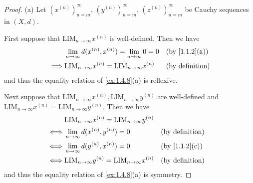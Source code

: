 \begin{proof}{(a)}
  Let \((x^{(n)})_{n = m}^\infty\), \((y^{(n)})_{n = m}^\infty\), \((z^{(n)})_{n = m}^\infty\) be Cauchy sequences in \((X, d)\).

  First suppose that \(\text{LIM}_{n \to \infty} x^{(n)}\) is well-defined.
  Then we have
  \begin{align*}
             & \lim_{n \to \infty} d(x^{(n)}, x^{(n)}) = \lim_{n \to \infty} 0 = 0   &  & \text{(by \cref{1.1.2}(a))} \\
    \implies & \text{LIM}_{n \to \infty} x^{(n)} = \text{LIM}_{n \to \infty} x^{(n)} &  & \text{(by definition)}
  \end{align*}
  and thus the equality relation of \cref{ex:1.4.8}(a) is reflexive.

  Next suppose that \(\text{LIM}_{n \to \infty} x^{(n)}, \text{LIM}_{n \to \infty} y^{(n)}\) are well-defined and \(\text{LIM}_{n \to \infty} x^{(n)} = \text{LIM}_{n \to \infty} y^{(n)}\).
  Then we have
  \begin{align*}
         & \text{LIM}_{n \to \infty} x^{(n)} = \text{LIM}_{n \to \infty} y^{(n)}                                  \\
    \iff & \lim_{n \to \infty} d(x^{(n)}, y^{(n)}) = 0                           &  & \text{(by definition)}      \\
    \iff & \lim_{n \to \infty} d(y^{(n)}, x^{(n)}) = 0                           &  & \text{(by \cref{1.1.2}(c))} \\
    \iff & \text{LIM}_{n \to \infty} y^{(n)} = \text{LIM}_{n \to \infty} x^{(n)} &  & \text{(by definition)}
  \end{align*}
  and thus the equality relation of \cref{ex:1.4.8}(a) is symmetry.


\end{proof}
